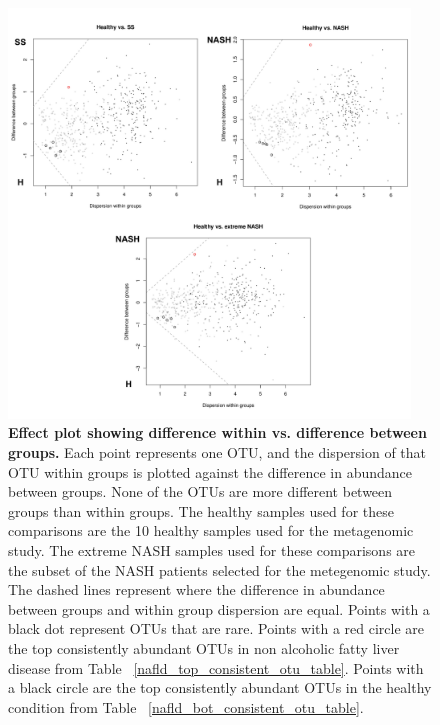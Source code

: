 \begin{figure}[h]
\begin{center}
\includegraphics[width=0.95\textwidth]{nafld_16s_aldex.png}
\caption[Effect plot showing difference within vs. difference between groups.]{\textbf{Effect plot showing difference within vs. difference between groups.} Each point represents one OTU, and the dispersion of that OTU within groups is plotted against the difference in abundance between groups. None of the OTUs are more different between groups than within groups. The healthy samples used for these comparisons are the 10 healthy samples used for the metagenomic study. The extreme NASH samples used for these comparisons are the subset of the NASH patients selected for the metegenomic study. The dashed lines represent where the difference in abundance between groups and within group dispersion are equal. Points with a black dot represent OTUs that are rare. Points with a red circle are the top consistently abundant OTUs in non alcoholic fatty liver disease from Table ~\ref{nafld_top_consistent_otu_table}. Points with a black circle are the top consistently abundant OTUs in the healthy condition from Table ~\ref{nafld_bot_consistent_otu_table}.}
\label{nafld_fig3}
\end{center}
\end{figure}

